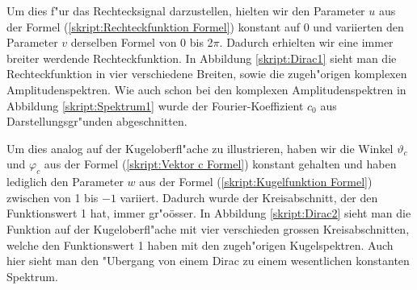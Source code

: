 \begin{refsection}
Um dies f"ur das Rechtecksignal darzustellen, hielten wir den Parameter
$u$ aus der Formel (\ref{skript:Rechteckfunktion Formel}) konstant auf 0 
und variierten den Parameter $v$ derselben Formel von 0 bis 2$\pi$. 
Dadurch erhielten wir eine immer breiter werdende Rechteckfunktion. 
In Abbildung \ref{skript:Dirac1} sieht man die Rechteckfunktion in 
vier verschiedene Breiten, sowie die zugeh"origen komplexen 
Amplitudenspektren. 
Wie auch schon bei den komplexen Amplitudenspektren in Abbildung
\ref{skript:Spektrum1} wurde der Fourier-Koeffizient $c_0$ aus 
Darstellungsgr"unden abgeschnitten.

Um dies analog auf der Kugeloberfl"ache zu illustrieren, haben 
wir die Winkel $\vartheta_c$ und $\varphi_c$ aus der Formel 
(\ref{skript:Vektor c Formel}) konstant  gehalten und haben lediglich 
den Parameter $w$ aus der Formel (\ref{skript:Kugelfunktion Formel}) 
zwischen von 1 bis $-1$ variiert. 
Dadurch wurde der Kreisabschnitt, der den Funktionswert 1 hat, immer 
gr"oösser. 
In Abbildung \ref{skript:Dirac2} sieht man die Funktion auf der 
Kugeloberfl"ache mit vier verschieden grossen Kreisabschnitten, welche 
den Funktionswert 1 haben mit den zugeh"origen Kugelspektren. Auch
hier sieht man den "Ubergang von einem Dirac zu einem wesentlichen 
konstanten Spektrum.


\end{refsection}
